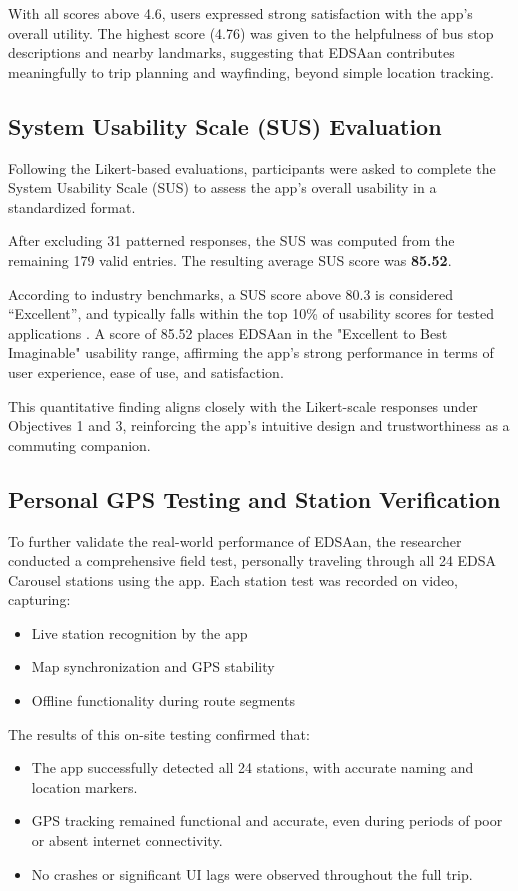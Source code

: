 \documentclass[journal]{./IEEE/IEEEtran}
\begin{document}
With all scores above 4.6, users expressed strong satisfaction with the app's overall utility. The highest score (4.76) was given to the helpfulness of bus stop descriptions and nearby landmarks, suggesting that EDSAan contributes meaningfully to trip planning and wayfinding, beyond simple location tracking.

\subsection{System Usability Scale (SUS) Evaluation}
Following the Likert-based evaluations, participants were asked to complete the System Usability Scale (SUS) to assess the app’s overall usability in a standardized format.

After excluding 31 patterned responses, the SUS was computed from the remaining 179 valid entries. The resulting average SUS score was \textbf{85.52}.

According to industry benchmarks, a SUS score above 80.3 is considered “Excellent”, and typically falls within the top 10\% of usability scores for tested applications \cite{Ref:019}. A score of 85.52 places EDSAan in the "Excellent to Best Imaginable" usability range, affirming the app’s strong performance in terms of user experience, ease of use, and satisfaction.

This quantitative finding aligns closely with the Likert-scale responses under Objectives 1 and 3, reinforcing the app's intuitive design and trustworthiness as a commuting companion.

\subsection{Personal GPS Testing and Station Verification}

To further validate the real-world performance of EDSAan, the researcher conducted a comprehensive field test, personally traveling through all 24 EDSA Carousel stations using the app. Each station test was recorded on video, capturing:

\begin{itemize}
    \item Live station recognition by the app
    \item Map synchronization and GPS stability
    \item Offline functionality during route segments
\end{itemize}

The results of this on-site testing confirmed that:
\begin{itemize}
\item The app successfully detected all 24 stations, with accurate naming and location markers.

\item GPS tracking remained functional and accurate, even during periods of poor or absent internet connectivity.

\item No crashes or significant UI lags were observed throughout the full trip.
\end{itemize}
\end{document}
